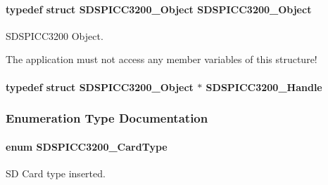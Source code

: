 \paragraph[{S\-D\-S\-P\-I\-C\-C3200\-\_\-\-Object}]{\setlength{\rightskip}{0pt plus 5cm}typedef struct {\bf S\-D\-S\-P\-I\-C\-C3200\-\_\-\-Object}  {\bf S\-D\-S\-P\-I\-C\-C3200\-\_\-\-Object}}\label{_s_d_s_p_i_c_c3200_8h_ac7c8f2ad346149f283d5a267a16feee7}


S\-D\-S\-P\-I\-C\-C3200 Object. 

The application must not access any member variables of this structure! 
\paragraph[{S\-D\-S\-P\-I\-C\-C3200\-\_\-\-Handle}]{\setlength{\rightskip}{0pt plus 5cm}typedef struct {\bf S\-D\-S\-P\-I\-C\-C3200\-\_\-\-Object} $\ast$ {\bf S\-D\-S\-P\-I\-C\-C3200\-\_\-\-Handle}}\label{_s_d_s_p_i_c_c3200_8h_a5b5f40039814acdfe2a666c59a845596}


\subsubsection{Enumeration Type Documentation}
\paragraph[{S\-D\-S\-P\-I\-C\-C3200\-\_\-\-Card\-Type}]{\setlength{\rightskip}{0pt plus 5cm}enum {\bf S\-D\-S\-P\-I\-C\-C3200\-\_\-\-Card\-Type}}\label{_s_d_s_p_i_c_c3200_8h_aef9c37db8744ba414b93ef56c1473be7}


S\-D Card type inserted. 

